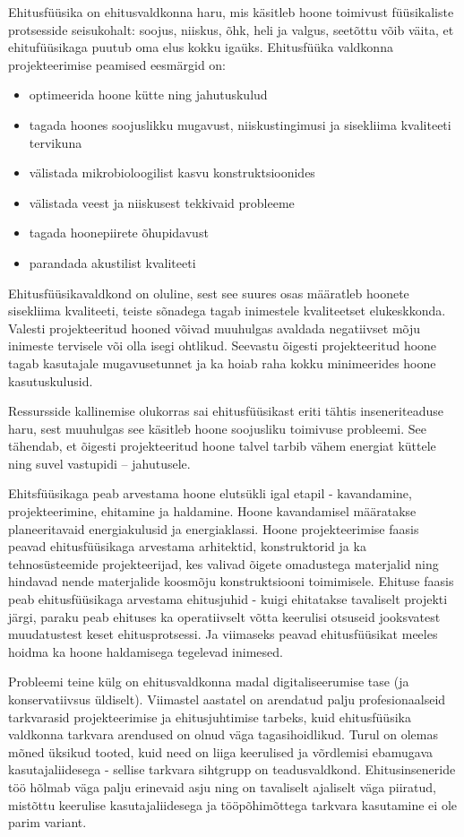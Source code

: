 Ehitusfüüsika on ehitusvaldkonna haru, mis käsitleb hoone toimivust füüsikaliste protsesside seisukohalt: soojus, niiskus, õhk, heli ja valgus,
seetõttu võib väita, et ehitufüüsikaga puutub oma elus kokku igaüks.
Ehitusfüüka valdkonna projekteerimise peamised eesmärgid on:
\begin{itemize}
    \item optimeerida hoone kütte ning jahutuskulud
    \item tagada hoones soojuslikku mugavust, niiskustingimusi ja sisekliima kvaliteeti tervikuna
    \item välistada mikrobioloogilist kasvu konstruktsioonides
    \item välistada veest ja niiskusest tekkivaid probleeme
    \item tagada hoonepiirete õhupidavust
    \item parandada akustilist kvaliteeti
\end{itemize}

Ehitusfüüsikavaldkond on oluline, sest see suures osas määratleb hoonete sisekliima kvaliteeti, teiste sõnadega tagab inimestele kvaliteetset 
elukeskkonda. Valesti projekteeritud hooned võivad muuhulgas avaldada negatiivset mõju inimeste tervisele või olla isegi ohtlikud. 
Seevastu õigesti projekteeritud hoone tagab kasutajale mugavusetunnet ja ka hoiab raha kokku minimeerides hoone kasutuskulusid.

Ressursside kallinemise olukorras sai ehitusfüüsikast eriti tähtis inseneriteaduse haru, sest muuhulgas see käsitleb hoone soojusliku 
toimivuse probleemi. See tähendab, et õigesti projekteeritud hoone talvel tarbib vähem energiat küttele ning suvel vastupidi -- jahutusele.

Ehitsfüüsikaga peab arvestama hoone elutsükli igal etapil - kavandamine, projekteerimine, ehitamine ja haldamine. Hoone kavandamisel 
määratakse planeeritavaid energiakulusid ja energiaklassi. Hoone projekteerimise faasis peavad ehitusfüüsikaga arvestama arhitektid, 
konstruktorid ja ka tehnosüsteemide projekteerijad, kes valivad õigete omadustega materjalid ning hindavad nende materjalide koosmõju 
konstruktsiooni toimimisele. Ehituse faasis peab ehitusfüüsikaga arvestama ehitusjuhid - kuigi ehitatakse tavaliselt projekti järgi, 
paraku peab ehituses ka operatiivselt võtta keerulisi otsuseid jooksvatest muudatustest keset ehitusprotsessi. Ja viimaseks peavad 
ehitusfüüsikat meeles hoidma ka hoone haldamisega tegelevad inimesed.

Probleemi teine külg on ehitusvaldkonna madal digitaliseerumise tase (ja konservatiivsus üldiselt). Viimastel aastatel on 
arendatud palju profesionaalseid tarkvarasid projekteerimise ja ehitusjuhtimise tarbeks, kuid ehitusfüüsika valdkonna 
tarkvara arendused on olnud väga tagasihoidlikud. Turul on olemas mõned üksikud tooted, kuid need on liiga keerulised ja võrdlemisi 
ebamugava kasutajaliidesega - sellise tarkvara sihtgrupp on teadusvaldkond. Ehitusinseneride töö hõlmab väga palju erinevaid asju 
ning on tavaliselt ajaliselt väga piiratud, mistõttu keerulise kasutajaliidesega ja tööpõhimõttega tarkvara kasutamine ei ole parim variant. 

